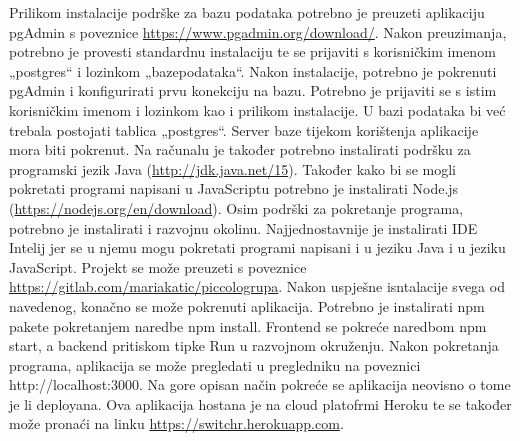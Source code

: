 Prilikom instalacije podrške za bazu podataka potrebno je preuzeti aplikaciju pgAdmin s poveznice
\url{https://www.pgadmin.org/download/}. Nakon preuzimanja, potrebno je provesti standardnu instalaciju 
te se prijaviti s korisničkim imenom „postgres“ i lozinkom „bazepodataka“.
Nakon instalacije, potrebno je pokrenuti pgAdmin i konfigurirati prvu konekciju na bazu. Potrebno je 
prijaviti se s istim korisničkim imenom i lozinkom kao i prilikom instalacije. U bazi podataka bi već 
trebala postojati tablica „postgres“. Server baze tijekom korištenja aplikacije mora biti pokrenut.
Na računalu je također potrebno instalirati podršku za programski jezik Java (\url{http://jdk.java.net/15}).
Također kako bi se mogli pokretati programi napisani u JavaScriptu potrebno je instalirati Node.js 
(\url{https://nodejs.org/en/download}). 
\vspace{3mm}
Osim podrški za pokretanje programa, potrebno je instalirati i razvojnu okolinu. Najjednostavnije je instalirati
IDE Intelij jer se u njemu mogu pokretati programi napisani i u jeziku Java i u jeziku JavaScript.
Projekt se može preuzeti s poveznice \url{https://gitlab.com/mariakatic/piccologrupa}.
Nakon uspješne isntalacije svega od navedenog, konačno se može pokrenuti aplikacija. 
Potrebno je instalirati npm pakete pokretanjem naredbe npm install. Frontend se pokreće naredbom npm start, a 
backend pritiskom tipke Run u razvojnom okruženju.
Nakon pokretanja programa, aplikacija se može pregledati u pregledniku na poveznici http://localhost:3000.
\vspace{3mm}
Na gore opisan način pokreće se aplikacija neovisno o tome je li deployana. Ova aplikacija hostana je na 
cloud platofrmi Heroku te se također može pronaći na linku \url{https://switchr.herokuapp.com}.
			
			
			\eject 